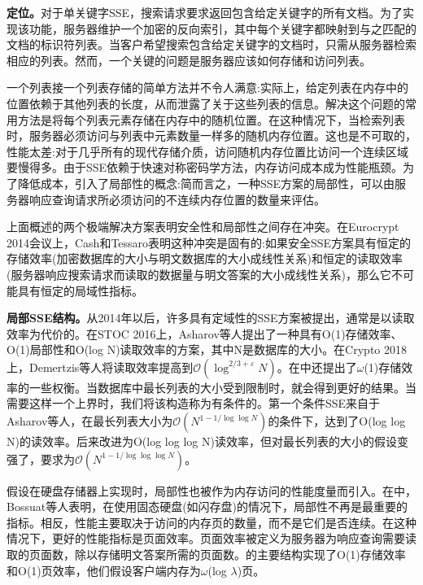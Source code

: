\documentclass[UTF8]{article}
\begin{document}
\textbf{定位。}对于单关键字SSE，搜索请求要求返回包含给定关键字的所有文档。为了实现该功能，服务器维护一个加密的反向索引，其中每个关键字都映射到与之匹配的文档的标识符列表。当客户希望搜索包含给定关键字的文档时，只需从服务器检索相应的列表。然而，一个关键的问题是服务器应该如何存储和访问列表。

一个列表接一个列表存储的简单方法并不令人满意:实际上，给定列表在内存中的位置依赖于其他列表的长度，从而泄露了关于这些列表的信息。解决这个问题的常用方法是将每个列表元素存储在内存中的随机位置。在这种情况下，当检索列表时，服务器必须访问与列表中元素数量一样多的随机内存位置。这也是不可取的，性能太差:对于几乎所有的现代存储介质，访问随机内存位置比访问一个连续区域要慢得多。由于SSE依赖于快速对称密码学方法，内存访问成本成为性能瓶颈。为了降低成本，\cite{DavidCash2014TheLO}引入了局部性的概念:简而言之，一种SSE方案的局部性，可以由服务器响应查询请求所必须访问的不连续内存位置的数量来评估。

上面概述的两个极端解决方案表明安全性和局部性之间存在冲突。在Eurocrypt 2014会议上，Cash和Tessaro表明这种冲突是固有的\cite{DavidCash2014TheLO}:如果安全SSE方案具有恒定的存储效率(加密数据库的大小与明文数据库的大小成线性关系)和恒定的读取效率(服务器响应搜索请求而读取的数据量与明文答案的大小成线性关系)，那么它不可能具有恒定的局域性指标。

\textbf{局部SSE结构。}从2014年以后，许多具有定域性的SSE方案被提出，通常是以读取效率为代价的。在STOC 2016上，Asharov等人提出了一种具有O(1)存储效率、O(1)局部性和O(log N)读取效率的方案，其中N是数据库的大小\cite{GiladAsharov2021SearchableSE}。在Crypto 2018上，Demertzis等人将读取效率提高到$\mathcal{O}\left(\log ^{2 / 3+\varepsilon} N\right)$\cite{IoannisDemertzis2018SearchableEW}。在\cite{IoannisDemertzis2017FastSE}中还提出了$\omega$(1)存储效率的一些权衡。当数据库中最长列表的大小受到限制时，就会得到更好的结果。当需要这样一个上界时，我们将该构造称为有条件的。第一个条件SSE来自于Asharov等人，在最长列表大小为$\mathcal{O}\left(N^{1-1 / \log \log N}\right)$的条件下，达到了O(log log N)的读效率。后来改进为O(log log log N)读效率，但对最长列表的大小的假设变强了，要求为$\mathcal{O}\left(N^{1-1 / \log \log \log N}\right)$。

假设在硬盘存储器上实现时，局部性也被作为内存访问的性能度量而引入。在\cite{AngleBossuat2021SSEAS}中，Bossuat等人表明，在使用固态硬盘(如闪存盘)的情况下，局部性不再是最重要的指标。相反，性能主要取决于访问的内存页的数量，而不是它们是否连续。在这种情况下，更好的性能指标是页面效率。页面效率被定义为服务器为响应查询需要读取的页面数，除以存储明文答案所需的页面数。\cite{AngleBossuat2021SSEAS}的主要结构实现了O(1)存储效率和O(1)页效率，他们假设客户端内存为$\omega$(log $\lambda$)页。
\end{document}
